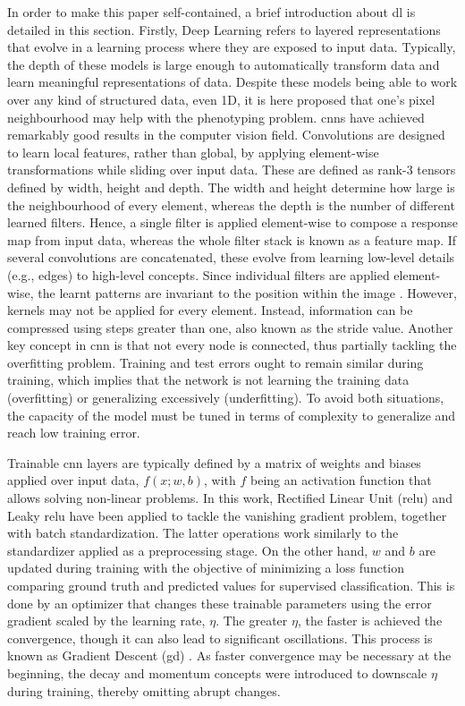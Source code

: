 In order to make this paper self-contained, a brief introduction about \acrshort{dl} is detailed in this section. Firstly, Deep Learning refers to layered representations that evolve in a learning process where they are exposed to input data. Typically, the depth of these models is large enough to automatically transform data and learn meaningful representations of data. Despite these models being able to work over any kind of structured data, even 1D, it is here proposed that one's pixel neighbourhood may help with the phenotyping problem. \acrshort{cnn}s have achieved remarkably good results in the computer vision field. Convolutions are designed to learn local features, rather than global, by applying element-wise transformations while sliding over input data. These are defined as rank-3 tensors defined by width, height and depth. The width and height determine how large is the neighbourhood of every element, whereas the depth is the number of different learned filters. Hence, a single filter is applied element-wise to compose a response map from input data, whereas the whole filter stack is known as a feature map. If several convolutions are concatenated, these evolve from learning low-level details (e.g., edges) to high-level concepts. Since individual filters are applied element-wise, the learnt patterns are invariant to the position within the image \cite{chollet_deep_2021}. However, kernels may not be applied for every element. Instead, information can be compressed using steps greater than one, also known as the stride value. Another key concept in \acrshort{cnn} is that not every node is connected, thus partially tackling the overfitting problem. Training and test errors ought to remain similar during training, which implies that the network is not learning the training data (overfitting) or generalizing excessively (underfitting). To avoid both situations, the capacity of the model must be tuned in terms of complexity to generalize and reach low training error.  

Trainable \acrshort{cnn} layers are typically defined by a matrix of weights and biases applied over input data, $f(x; w, b)$, with $f$ being an activation function that allows solving non-linear problems. In this work, Rectified Linear Unit (\acrshort{relu}) and Leaky \acrshort{relu} have been applied to tackle the vanishing gradient problem, together with batch standardization. The latter operations work similarly to the standardizer applied as a preprocessing stage. On the other hand, $w$ and $b$ are updated during training with the objective of minimizing a loss function comparing ground truth and predicted values for supervised classification. This is done by an optimizer that changes these trainable parameters using the error gradient scaled by the learning rate, $\eta$. The greater $\eta$, the faster is achieved the convergence, though it can also lead to significant oscillations. This process is known as Gradient Descent (\acrshort{gd}) \cite{kattenborn_review_2021}. As faster convergence may be necessary at the beginning, the decay and momentum concepts were introduced to downscale $\eta$ during training, thereby omitting abrupt changes.

